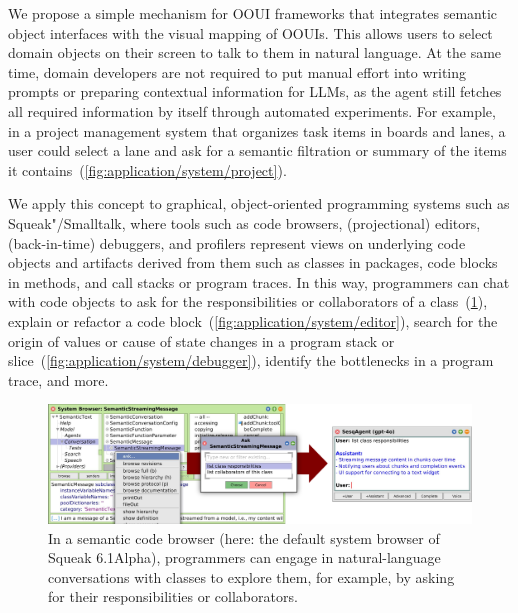 We propose a simple mechanism for OOUI frameworks that integrates semantic object interfaces with the visual mapping of OOUIs.
This allows users to select domain objects on their screen to talk to them in natural language.
At the same time, domain developers are not required to put manual effort into writing prompts or preparing contextual information for LLMs, as the agent still fetches all required information by itself through automated experiments.
For example, in a project management system that organizes task items in boards and lanes, a user could select a lane and ask for a semantic filtration or summary of the items it contains~(\cref{fig:application/system/project}).

We apply this concept to graphical, object-oriented programming systems such as Squeak"/Smalltalk, where tools such as code browsers, (projectional) editors, (back-in-time) debuggers, and profilers represent views on underlying code objects and artifacts derived from them such as classes in packages, code blocks in methods, and call stacks or program traces.
In this way, programmers can chat with code objects to ask for the responsibilities or collaborators of a class~(\cref{fig:application/system/browser}), explain or refactor a code block~(\cref{fig:application/system/editor}), search for the origin of values or cause of state changes in a program stack or slice~(\cref{fig:application/system/debugger}), identify the bottlenecks in a program trace, and more.

\FloatBarrier

\begin{figure}[Z]
	\centering
	\includegraphics[width=\linewidth]{chapters/08_application/03_system/browser.png}
	\caption[In a semantic code browser, programmers can engage in natural-language conversations with classes to explore them.]{
		In a semantic code browser (here: the default system browser of Squeak 6.1Alpha), programmers can engage in natural-language conversations with classes to explore them, for example, by asking for their responsibilities or collaborators.
	}
	\label{fig:application/system/browser}
\end{figure}


